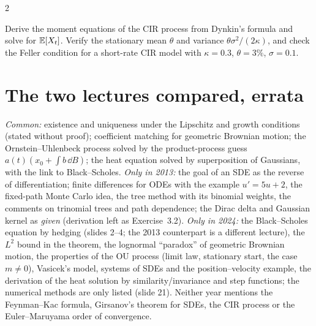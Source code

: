 \begin{paracol}{2}
\begin{exercise}\label{ch18:ex-cir}
Derive the moment equations of the CIR process from Dynkin's formula and solve for $\mathbb{E}[X_t]$. Verify the stationary mean $\theta$ and variance $\theta\sigma^2/(2\kappa)$, and check the Feller condition for a short-rate CIR model with $\kappa=0.3$, $\theta=3\%$, $\sigma=0.1$.
\end{exercise}

\section{The two lectures compared, errata}\label{ch18:sec-compare}

\begin{coursenote}
\emph{Common:} existence and uniqueness under the Lipschitz and growth conditions (stated without proof); coefficient matching for geometric Brownian motion; the Ornstein--Uhlenbeck process solved by the product-process guess $a(t)(x_0+\int b\,\dd B)$; the heat equation solved by superposition of Gaussians, with the link to Black--Scholes. \emph{Only in 2013:} the goal of an SDE as the reverse of differentiation; finite differences for ODEs with the example $u'=5u+2$, the fixed-path Monte Carlo idea, the tree method with its binomial weights, the comments on trinomial trees and path dependence; the Dirac delta and Gaussian kernel as \emph{given} (derivation left as Exercise~3.2). \emph{Only in 2024:} the Black--Scholes equation by hedging (slides 2--4; the 2013 counterpart is a different lecture), the $L^2$ bound in the theorem, the lognormal ``paradox'' of geometric Brownian motion, the properties of the OU process (limit law, stationary start, the case $m\ne0$), Vasicek's model, systems of SDEs and the position--velocity example, the derivation of the heat solution by similarity/invariance and step functions; the numerical methods are only listed (slide 21). Neither year mentions the Feynman--Kac formula, Girsanov's theorem for SDEs, the CIR process or the Euler--Maruyama order of convergence.
\end{coursenote}


\end{paracol}
